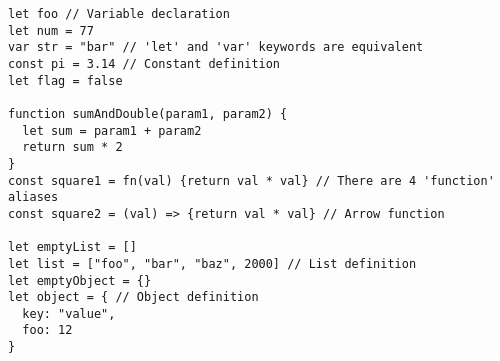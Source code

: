 \vspace{-2.5em}
\begin{center}
\begin{minipage}[t]{1\textwidth}
\begin{listing}[H]
\begin{spacing}{0.6}
\begin{verbatim}
let foo // Variable declaration
let num = 77
var str = "bar" // 'let' and 'var' keywords are equivalent
const pi = 3.14 // Constant definition
let flag = false

function sumAndDouble(param1, param2) {
  let sum = param1 + param2
  return sum * 2
}
const square1 = fn(val) {return val * val} // There are 4 'function' aliases
const square2 = (val) => {return val * val} // Arrow function

let emptyList = []
let list = ["foo", "bar", "baz", 2000] // List definition
let emptyObject = {}
let object = { // Object definition
  key: "value",
  foo: 12
}
\end{verbatim}
\end{spacing}
\end{listing}
\end{minipage}
\end{center}
